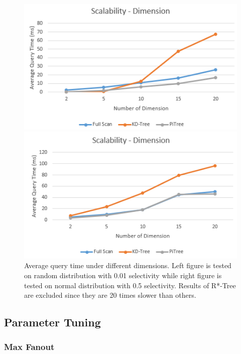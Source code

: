 \documentclass[sigconf,10pt]{acmart}
\begin{document}
\begin{figure}[ht] 
  \label{scalability-dimension} 
  \begin{minipage}[b]{0.45\linewidth}
    \centering
    \includegraphics[width=.8\linewidth]{../figures/scalability/dimension-random} 
    \vspace{4ex}
  \end{minipage}%
  \begin{minipage}[b]{0.45\linewidth}
    \centering
    \includegraphics[width=.8\linewidth]{../figures/scalability/dimension-normal} 
    \vspace{4ex}
  \end{minipage}%
  \caption{Average query time under different dimensions. Left figure is tested
  on random distribution with 0.01 selectivity while right figure is tested on normal distribution
  with 0.5 selectivity.
  Results of R*-Tree are excluded since they are 20 times slower than others.}
\end{figure}

\subsection{Parameter Tuning}

\subsubsection{Max Fanout}
\end{document}
